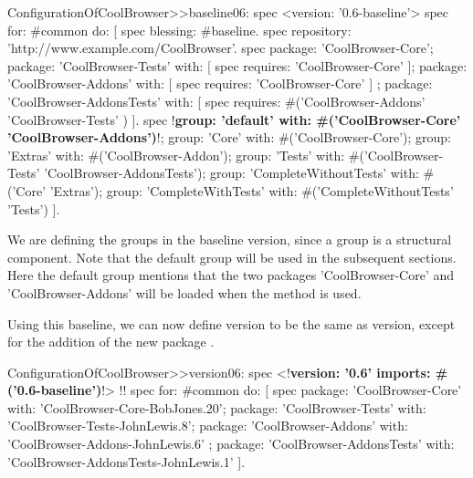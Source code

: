 \documentclass[a4paper,10pt,twoside]{book}
\begin{document}
 
\begin{code}{}
ConfigurationOfCoolBrowser>>baseline06: spec 
     <version: '0.6-baseline'>
     spec for: #common do: [
          spec blessing: #baseline.
          spec repository: 'http://www.example.com/CoolBrowser'.
          spec 
                 package: 'CoolBrowser-Core';
                 package: 'CoolBrowser-Tests' with: [ spec requires: 'CoolBrowser-Core' ];
                 package: 'CoolBrowser-Addons' with: [ spec requires: 'CoolBrowser-Core' ] ;
                 package: 'CoolBrowser-AddonsTests' with: [ 
                      spec requires: #('CoolBrowser-Addons' 'CoolBrowser-Tests' ) ].
          spec 
                 !\textbf{group: 'default' with: \#('CoolBrowser-Core' 'CoolBrowser-Addons')}!;
                 group: 'Core' with: #('CoolBrowser-Core');
                 group: 'Extras' with: #('CoolBrowser-Addon');
                 group: 'Tests' with: #('CoolBrowser-Tests' 'CoolBrowser-AddonsTests');
                 group: 'CompleteWithoutTests' with: #('Core' 'Extras');
                 group: 'CompleteWithTests' with: #('CompleteWithoutTests' 'Tests')
               ].
\end{code}


 
We are defining the groups in the baseline version, since a group is a structural component. Note that the default group will be used in the subsequent sections. Here the default group mentions that the two packages 'CoolBrowser-Core' and 'CoolBrowser-Addons' will be loaded when the method  is used.

Using this baseline, we can now define version  to be the same as version, except for the addition of the new package .
 
\begin{code}{}
ConfigurationOfCoolBrowser>>version06: spec 
       <!\textbf{version: '0.6' imports: \#('0.6-baseline')}!>
!\vspace{-0.7ex}!
      spec for: #common do: [
            spec 
                  package: 'CoolBrowser-Core' with: 'CoolBrowser-Core-BobJones.20';
                  package: 'CoolBrowser-Tests' with: 'CoolBrowser-Tests-JohnLewis.8';
                  package: 'CoolBrowser-Addons' with: 'CoolBrowser-Addons-JohnLewis.6' ;
                  package: 'CoolBrowser-AddonsTests' with: 'CoolBrowser-AddonsTests-JohnLewis.1' ].
\end{code}

 
\end{document}
